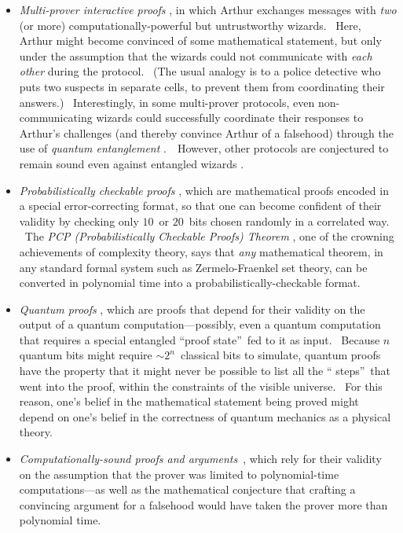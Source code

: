 \documentclass[12pt,onecolumn]{article}%
\begin{document}
\begin{itemize}
\item \textit{Multi-prover interactive proofs} \cite{bgkw,bfl}, in which
Arthur exchanges messages with \textit{two} (or more) computationally-powerful
but untrustworthy wizards. \ Here, Arthur might become convinced of some
mathematical statement, but only under the assumption that the wizards could
not communicate with \textit{each other} during the protocol. \ (The usual
analogy is to a police detective who puts two suspects in separate cells, to
prevent them from coordinating their answers.) \ Interestingly, in some
multi-prover protocols, even non-communicating wizards could successfully
coordinate their responses to Arthur's challenges (and thereby convince Arthur
of a falsehood) through the use of \textit{quantum entanglement}
\cite{chtw}.\ \ However, other protocols are conjectured to remain sound even
against entangled wizards \cite{kkmtv}.

\item \textit{Probabilistically checkable proofs} \cite{fglss,arorasafra},
which are mathematical proofs encoded in a special error-correcting format, so
that one can become confident of their validity by checking only $10$\ or
$20$\ bits chosen randomly in a correlated way. \ The \textit{PCP
(Probabilistically Checkable Proofs) Theorem} \cite{almss,dinur}, one of the
crowning achievements of complexity theory, says that \textit{any}
mathematical theorem, in any standard formal system such as Zermelo-Fraenkel
set theory, can be converted in polynomial time into a
probabilistically-checkable format.

\item \textit{Quantum proofs} \cite{watrous,ak}, which are proofs that depend
for their validity on the output of a quantum computation---possibly, even a
quantum computation that requires a special entangled \textquotedblleft proof
state\textquotedblright\ fed to it as input. \ Because $n$ quantum bits might
require $\sim2^{n}$\ classical bits to simulate, quantum proofs have the
property that it might never be possible to list all the \textquotedblleft
steps\textquotedblright\ that went into the proof, within the constraints of
the visible universe. \ For this reason, one's belief in the mathematical
statement being proved might depend on one's belief in the correctness of
quantum mechanics as a physical theory.

\item \textit{Computationally-sound proofs and arguments}\ \cite{bcc,micali},
which rely for their validity on the assumption that the prover was limited to
polynomial-time computations---as well as the mathematical conjecture that
crafting a convincing argument for a falsehood would have taken the prover
more than polynomial time.
\end{itemize}
\end{document}

